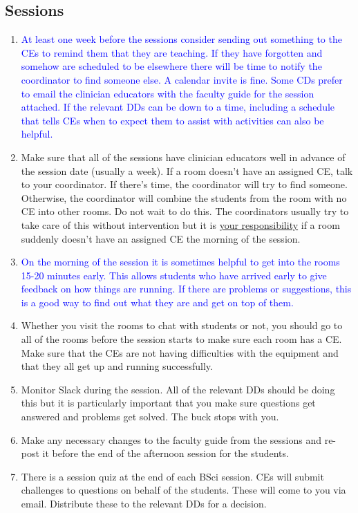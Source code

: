 \documentclass[11pt]{article}
\newcommand{\trsem}[1]{\textcolor{blue}{#1}}
\begin{document}
\subsection*{Sessions}

\begin{enumerate}
    \def\labelenumi{\trsem{\arabic{enumi}.}}
  \item \trsem{At least one week before the sessions consider sending out something to the CEs to remind them that they are teaching.  If they have forgotten and somehow are scheduled to be elsewhere there will be time to notify the coordinator to find someone else.  A calendar invite is fine.  Some CDs prefer to email the clinician educators with the faculty guide for the session attached.  If the relevant DDs can be down to a time, including a schedule that tells CEs when to expect them to assist with activities can also be helpful.}
      \def\labelenumi{\arabic{enumi}.}
    \item Make sure that all of the sessions have clinician educators well in advance of the session date (usually a week).  If a room doesn't have an assigned CE, talk to your coordinator.  If there's time, the coordinator will try to find someone.  Otherwise, the coordinator will combine the students from the room with no CE into other rooms.  Do not wait to do this.  The coordinators usually try to take care of this without intervention but it is \underline{your responsibility} if a room suddenly doesn't have an assigned CE the morning of the session.
        \def\labelenumi{\trsem{\arabic{enumi}.}}
      \item \trsem{On the morning of the session it is sometimes helpful to get into the rooms 15-20 minutes early.  This allows students who have arrived early to give feedback on how things are running.  If there are problems or suggestions, this is a good way to find out what they are and get on top of them.}
          \def\labelenumi{\arabic{enumi}.}
\item Whether you visit the rooms to chat with students or not, you should go to all of the rooms before the session starts to make sure each room has a CE.  Make sure that the CEs are not having difficulties with the equipment and that they all get up and running successfully.
\item Monitor Slack during the session. All of the relevant DDs should be doing this but it is particularly important that you make sure questions get answered and problems get solved.  The buck stops with you.
\item Make any necessary changes to the faculty guide from the sessions and re-post it before the end of the afternoon session for the students.
\item There is a session quiz at the end of each BSci session.  CEs will submit challenges to questions on behalf of the students.  These will come to you via email.  Distribute these to the relevant DDs for a decision.
\end{enumerate}
\end{document}
